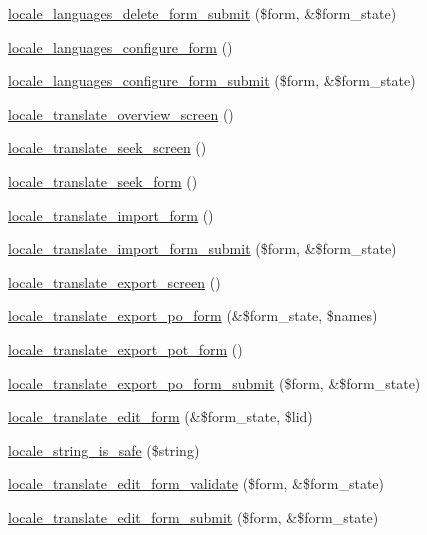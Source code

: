 \begin{CompactItemize}
\item 
\hyperlink{group__locale_gdbf1eb80de38d65bda55e63699822e3c}{locale\_\-languages\_\-delete\_\-form\_\-submit} (\$form, \&\$form\_\-state)
\item 
\hyperlink{group__locale_gd4a0fb5717a5318793af57ec86169949}{locale\_\-languages\_\-configure\_\-form} ()
\item 
\hyperlink{group__locale_gd11520d8b7d086b4b801b4a51068ed11}{locale\_\-languages\_\-configure\_\-form\_\-submit} (\$form, \&\$form\_\-state)
\item 
\hyperlink{group__locale_gc36ea050ad5c0a75624c1a9b63c343a0}{locale\_\-translate\_\-overview\_\-screen} ()
\item 
\hyperlink{group__locale_ga34fbb14f95e9ae562772895b284d170}{locale\_\-translate\_\-seek\_\-screen} ()
\item 
\hyperlink{group__locale_g6c5573388bc6f44b3743165fb3401b6c}{locale\_\-translate\_\-seek\_\-form} ()
\item 
\hyperlink{group__locale_gfe5de636ff53a23b1da268287aec6ecf}{locale\_\-translate\_\-import\_\-form} ()
\item 
\hyperlink{group__locale_gb96d979ef16a3468061ebb7e11e3210e}{locale\_\-translate\_\-import\_\-form\_\-submit} (\$form, \&\$form\_\-state)
\item 
\hyperlink{group__locale_ga04044044d6c484553a41432db3924b4}{locale\_\-translate\_\-export\_\-screen} ()
\item 
\hyperlink{group__locale_g8383d501e09c3b58fa391ce7a709a8e3}{locale\_\-translate\_\-export\_\-po\_\-form} (\&\$form\_\-state, \$names)
\item 
\hyperlink{group__locale_g670f0a541fc0b97da4bf4624c2afb434}{locale\_\-translate\_\-export\_\-pot\_\-form} ()
\item 
\hyperlink{group__locale_ga8f71c53db9e03719bdeae8f594fb0ee}{locale\_\-translate\_\-export\_\-po\_\-form\_\-submit} (\$form, \&\$form\_\-state)
\item 
\hyperlink{group__locale_g08d9a7d27e6a26ca6cd4d9148f2973ce}{locale\_\-translate\_\-edit\_\-form} (\&\$form\_\-state, \$lid)
\item 
\hyperlink{group__locale_g60fba74a6fc736cec4df566aa165ca14}{locale\_\-string\_\-is\_\-safe} (\$string)
\item 
\hyperlink{group__locale_g93fc48be446148e648c9a1d0f630726e}{locale\_\-translate\_\-edit\_\-form\_\-validate} (\$form, \&\$form\_\-state)
\item 
\hyperlink{group__locale_gdbeab4019dcbf389a12af893cdaad5d5}{locale\_\-translate\_\-edit\_\-form\_\-submit} (\$form, \&\$form\_\-state)

\end{CompactItemize}
